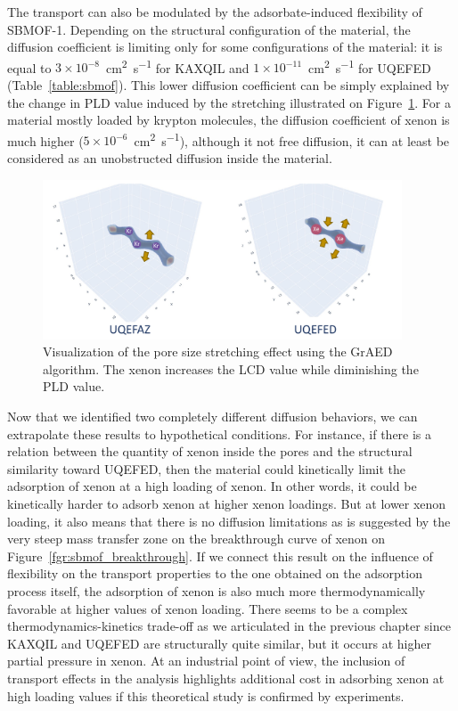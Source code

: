 \documentclass[main]{subfiles}
\begin{document}
The transport can also be modulated by the adsorbate-induced flexibility of SBMOF-1. Depending on the structural configuration of the material, the diffusion coefficient is limiting only for some configurations of the material: it is equal to $3\times10^{-8}$~\si{\square\cm\per\s} for KAXQIL and $1\times10^{-11}$~\si{\square\cm\per\s} for UQEFED (Table~\ref{table:sbmof}). This lower diffusion coefficient can be simply explained by the change in PLD value induced by the stretching illustrated on Figure~\ref{fgr:stretch}. For a material mostly loaded by krypton molecules, the diffusion coefficient of xenon is much higher ($5\times10^{-6}$~\si{\square\cm\per\s}), although it not free diffusion, it can at least be considered as an unobstructed diffusion inside the material. 

\begin{figure}[ht]
  \centering
  \includegraphics[width=0.95\textwidth]{figures/6-perspectives/KAXQIL_stretch.pdf}
  \caption{ Visualization of the pore size stretching effect using the GrAED algorithm. The xenon increases the LCD value while diminishing the PLD value. }\label{fgr:stretch}
\end{figure}

Now that we identified two completely different diffusion behaviors, we can extrapolate these results to hypothetical conditions. For instance, if there is a relation between the quantity of xenon inside the pores and the structural similarity toward UQEFED, then the material could kinetically limit the adsorption of xenon at a high loading of xenon. In other words, it could be kinetically harder to adsorb xenon at higher xenon loadings. But at lower xenon loading, it also means that there is no diffusion limitations as is suggested by the very steep mass transfer zone on the breakthrough curve of xenon on Figure~\ref{fgr:sbmof_breakthrough}. If we connect this result on the influence of flexibility on the transport properties to the one obtained on the adsorption process itself, the adsorption of xenon is also much more thermodynamically favorable at higher values of xenon loading. There seems to be a complex thermodynamics-kinetics trade-off as we articulated in the previous chapter since KAXQIL and UQEFED are structurally quite similar, but it occurs at higher partial pressure in xenon. At an industrial point of view, the inclusion of transport effects in the analysis highlights additional cost in adsorbing xenon at high loading values if this theoretical study is confirmed by experiments.
\end{document}
